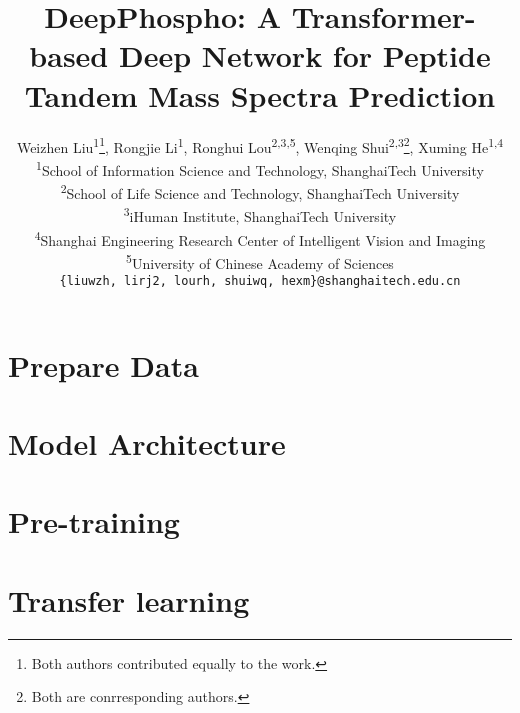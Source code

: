 \documentclass[final]{cvpr}
\begin{document}
\title{DeepPhospho: A Transformer-based Deep Network for Peptide \\Tandem Mass Spectra Prediction}

\author{Weizhen Liu\textsuperscript{1}\thanks{Both authors contributed equally to the work.}, Rongjie Li\textsuperscript{1}\footnotemark[1], 
Ronghui Lou\textsuperscript{2,3,5}, 
Wenqing Shui\textsuperscript{2,3}\thanks{Both are conrresponding authors.}, 
Xuming He\textsuperscript{1,4}\footnotemark[2]\\
\textsuperscript{1}School of Information Science and Technology, ShanghaiTech University\\
\textsuperscript{2}School of Life Science and Technology, ShanghaiTech University\\
\textsuperscript{3}iHuman Institute, ShanghaiTech University\\
\textsuperscript{4}Shanghai Engineering Research Center of Intelligent Vision and Imaging\\
\textsuperscript{5}University of Chinese Academy of Sciences\\
{\tt\small \{liuwzh, lirj2, lourh, shuiwq, hexm\}@shanghaitech.edu.cn}
}

\maketitle

% 


% 

% 

\section{Prepare Data}


\section{Model Architecture}



\section{Pre-training}



\section{Transfer learning}



{\small


}
\end{document}

